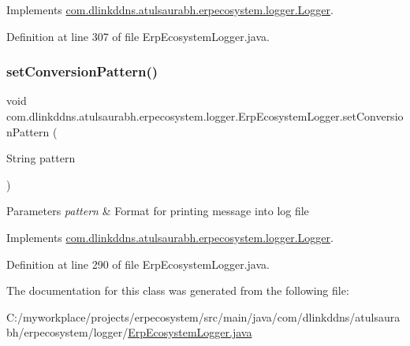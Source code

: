 Implements \mbox{\hyperlink{interfacecom_1_1dlinkddns_1_1atulsaurabh_1_1erpecosystem_1_1logger_1_1_logger_a05aa52bed792e7a4a3519dadaab2f4f3}{com.\+dlinkddns.\+atulsaurabh.\+erpecosystem.\+logger.\+Logger}}.



Definition at line 307 of file Erp\+Ecosystem\+Logger.\+java.

\mbox{\label{classcom_1_1dlinkddns_1_1atulsaurabh_1_1erpecosystem_1_1logger_1_1_erp_ecosystem_logger_a16d43ce13e22b9fae1b9e3b55a086b06}} 
\subsubsection{\texorpdfstring{set\+Conversion\+Pattern()}{setConversionPattern()}}
{\footnotesize\ttfamily void com.\+dlinkddns.\+atulsaurabh.\+erpecosystem.\+logger.\+Erp\+Ecosystem\+Logger.\+set\+Conversion\+Pattern (\begin{DoxyParamCaption}\item[{String}]{pattern }\end{DoxyParamCaption})}


\begin{DoxyParams}{Parameters}
{\em pattern} & Format for printing message into log file \\
\hline
\end{DoxyParams}


Implements \mbox{\hyperlink{interfacecom_1_1dlinkddns_1_1atulsaurabh_1_1erpecosystem_1_1logger_1_1_logger_add9a38d7fa3907aa924bdfe56f3fe5c3}{com.\+dlinkddns.\+atulsaurabh.\+erpecosystem.\+logger.\+Logger}}.



Definition at line 290 of file Erp\+Ecosystem\+Logger.\+java.



The documentation for this class was generated from the following file\+:\begin{DoxyCompactItemize}
\item 
C\+:/myworkplace/projects/erpecosystem/src/main/java/com/dlinkddns/atulsaurabh/erpecosystem/logger/\mbox{\hyperlink{_erp_ecosystem_logger_8java}{Erp\+Ecosystem\+Logger.\+java}}\end{DoxyCompactItemize}
